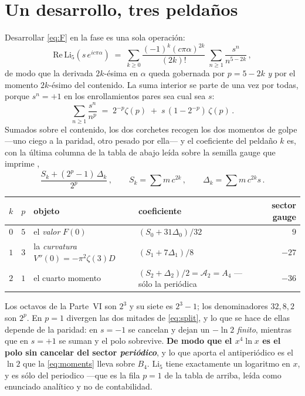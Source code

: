 \documentclass[11pt,a4paper]{article}
\begin{document}
\section{Un desarrollo, tres peldaños}\label{sec:ladder}

Desarrollar \eqref{eq:F} en la fase es una sola operación:
\begin{equation}\label{eq:expansion}
  \mathrm{Re}\,\mathrm{Li}_5\!\left(s\,e^{ic\pi\alpha}\right)
  \;=\;\sum_{k\ge0}\frac{(-1)^k (c\pi\alpha)^{2k}}{(2k)!}\;\sum_{n\ge1}\frac{s^n}{n^{5-2k}}\,,
\end{equation}
de modo que la derivada $2k$-ésima en $\alpha$ queda gobernada por $p=5-2k$ \emph{y} por el momento
$2k$-ésimo del contenido. La suma interior se parte de una vez por todas, porque $s^n=+1$ en los
enrollamientos pares sea cual sea $s$:
\begin{equation}\label{eq:split}
  \sum_{n\ge1}\frac{s^n}{n^{p}}\;=\;2^{-p}\zeta(p)\;+\;s\,(1-2^{-p})\,\zeta(p)\,.
\end{equation}
Sumados sobre el contenido, los dos corchetes recogen los dos momentos de golpe ---uno ciego a la
paridad, otro pesado por ella--- y el coeficiente del peldaño $k$ es, con la última columna de la
tabla de abajo leída sobre la semilla gauge que imprime \cite{KM25},
\begin{equation}\label{eq:rung}
  \frac{S_k+(2^{p}-1)\,\Delta_k}{2^{p}}\,,\qquad
  S_k=\sum m\,c^{2k}\,,\qquad \Delta_k=\sum m\,c^{2k}s\,.
\end{equation}

\begin{center}\small
{}
\begin{tabular}{ccll r}
\toprule
\rowcolor{hdrblue!10}$k$ & $p$ & objeto & coeficiente & sector gauge\\
\midrule
$0$ & $5$ & el \emph{valor} $F(0)$ & $(S_0+31\Delta_0)/32$ & $9$\\
\rowcolor{amber!14}$1$ & $3$ & la \emph{curvatura} $V''(0)=-\pi^2\zeta(3)D$ & $(S_1+7\Delta_1)/8$ & $-27$\\
$2$ & $1$ & el cuarto momento & $(S_2+\Delta_2)/2=\mathcal{A}_2=A_4$ --- sólo la periódica & $-36$\\
\bottomrule
\end{tabular}
\end{center}

\noindent Los octavos de la Parte~VI son $2^3$ y su siete es $2^3-1$; los denominadores $32,8,2$ son
$2^p$. En $p=1$ divergen las dos mitades de \eqref{eq:split}, y lo que se hace de ellas depende de
la paridad: en $s=-1$ se cancelan y dejan un $-\ln2$ \emph{finito}, mientras que en $s=+1$ se suman
y el polo sobrevive. \textbf{De modo que el $x^4\ln x$ es el polo sin cancelar del sector
\emph{periódico}}, y lo que aporta el antiperiódico es el $\ln2$ que la \eqref{eq:moments} lleva
sobre $B_4$. $\mathrm{Li}_5$ tiene exactamente un logaritmo en $x$, y es sólo del periodico ---que
es la fila $p=1$ de la tabla de arriba, leída como enunciado analítico y no de contabilidad.
\end{document}
